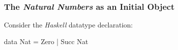 \documentclass{seminar}
\begin{document}
\begin{slide}



\newslide












\subsubsection*{The \textit{Natural Numbers} as an Initial Object}

Consider the \textit{Haskell} datatype declaration:

\begin{code}
data Nat = Zero | Succ Nat
\end{code}


\end{slide}
\end{document}
